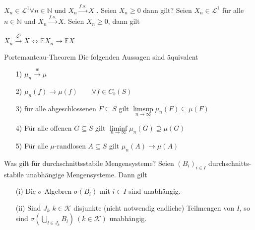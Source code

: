\documentclass[avery5371,grid,frame]{flashcards} %
\newcommand{\E}{\mathbb{E}}
\newcommand{\N}{\mathbb{N}}
\newcommand{\1}{ \mathbb{1} } %
\begin{document}
\begin{flashcard}[Satz]{$X_n \in \mathcal{L}^1 \forall n\in \mathbb{N}$  und $X_n \overset{f.s.}{\to} X$ . Seien $X_n \geq 0$ dann gilt?}
  Seien $X_n \in \mathcal{L}^1$ für alle $n \in \N$ und $X_n
  \overset{f.s.}{\to} X$. Seien $X_n\geq 0$, dann gilt
  \begin{center}
    $X_n \overset{\mathcal{L}^1}{\to} X \Leftrightarrow \E X_n \to \E
    X$
  \end{center}
\end{flashcard}

\begin{flashcard}[Satz]{Portemanteau-Theorem}
  Die folgenden Aussagen sind äquivalent
  \begin{itemize}
  \item[1)] $\mu_n \overset{w}{\to} \mu$
  \item[2)] $\mu_n(f) \to \mu(f) \qquad \forall f \in C_b(S)$
  \item[3)] für alle abgeschlossenen $F \subseteq S$ gilt
      $\limsup\limits_{n \to \infty} \mu_n(F) \subseteq \mu(F)$
  \item[4)] Für alle offenen $G \subseteq S$ gilt
      $\liminf\limits_{n \to \infty}\mu_n(G) \supseteq \mu(G)$
  \item[5)] Für alle $\mu$-randlosen $A \subseteq S$ gilt
      $\mu_n(A) \to \mu(A)$
  \end{itemize}
\end{flashcard}

\begin{flashcard}[Satz]{Was gilt für durchschnittsstabile Mengensysteme?}
  Seien $\left(B_{i}\right)_{i\in I}$ durchschnitts-stabile unabhängige
  Mengensysteme. Dann gilt
  \begin{itemize}
  \item [{(i)}] Die $\sigma$-Algebren $\sigma\left(B_{i}\right)$ mit $i\in I$
    sind unabhängig.
  \item [{(ii)}] Sind $J_{k}$ $k\in\mathcal{K}$ disjunkte (nicht notwendig
    endliche) Teilmengen von $I$, so sind
    $\sigma\left(\bigcup_{l\in J_{k}}B_{l}\right)\ \left(k\in\mathcal{K}\right)$
    unabhängig. \label{s1.2(ii)}
  \end{itemize}
\end{flashcard}
\end{document}
